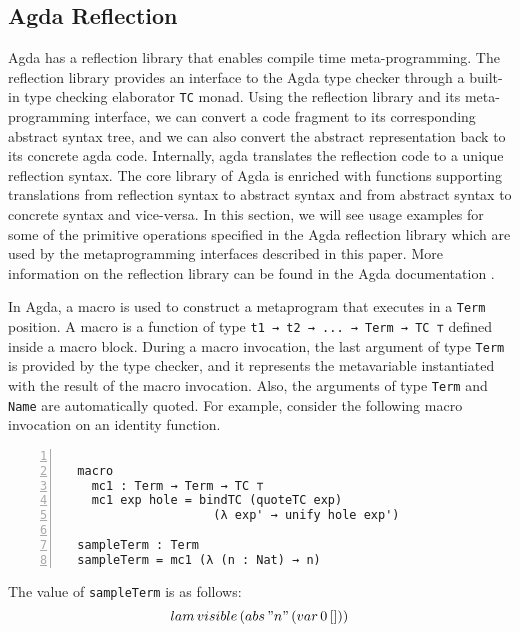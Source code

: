 \documentclass[sigplan,10pt]{acmart}
\begin{document}
\subsection{Agda Reflection}
\label{sec:sec2.1}
Agda has a reflection library that enables compile time meta-programming. The reflection library provides an interface to the Agda type checker through a built-in type checking elaborator {\tt TC} monad. Using the reflection library and its meta-programming interface, we can convert a code fragment to its corresponding abstract syntax tree, and we can also convert the abstract representation back to its concrete agda code. Internally, agda translates the reflection code to a unique reflection syntax. The core library of Agda is enriched with functions supporting translations from reflection syntax to abstract syntax and from abstract syntax to concrete syntax and vice-versa. In this section, we will see usage examples for some of the primitive operations specified in the Agda reflection library which are used by the metaprogramming interfaces described in this paper. More information on the reflection library can be found in the Agda documentation \cite{Agda-doc-2017}.

In Agda, a macro is used to construct a metaprogram that executes in a {\tt Term} position. A macro is a function of type {\tt t1 → t2 → ... → Term → TC ⊤} defined inside a macro block. During a macro invocation, the last argument of type {\tt Term} is provided by the type checker, and it represents the metavariable instantiated with the result of the macro invocation. Also, the arguments of type {\tt Term} and {\tt Name} are automatically quoted. For example, consider the following macro invocation on an identity function.

\begin{center}
\begingroup
\fontsize{7pt}{9pt}\selectfont
\begin{Verbatim}[frame = lines, rulecolor=\color{blue}, numbers = left, numbersep = 0pt]

  macro
    mc1 : Term → Term → TC ⊤
    mc1 exp hole = bindTC (quoteTC exp) 
                     (λ exp' → unify hole exp')

  sampleTerm : Term
  sampleTerm = mc1 (λ (n : Nat) → n) 

\end{Verbatim}
\endgroup
\end{center}

\normalsize

The value of {\tt sampleTerm} is as follows: 
\begin{equation} \label{eq:lam}
	lam \, visible \, (abs \, "n" \, (var \, 0 \, []))
\end{equation}
\end{document}
